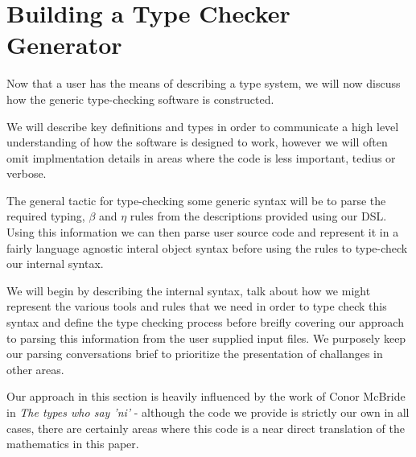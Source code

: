 \chapter{Building a Type Checker Generator}

Now that a user has the means of describing a type system, we will now
discuss how the generic type-checking software is constructed.

We will describe key definitions and types in order to communicate a
high level understanding of how the software is designed to work,
however we will often omit implmentation details in areas where the
code is less important, tedius or verbose.

The general tactic for type-checking some generic syntax will be to
parse the required typing, $\beta$ and $\eta$ rules from the
descriptions provided using our DSL. Using this information we can
then parse user source code and represent it in a fairly language
agnostic interal object syntax before using the rules to type-check
our internal syntax.

We will begin by describing the internal syntax, talk about how we
might represent the various tools and rules that we need in order to
type check this syntax and define the type checking process before
breifly covering our approach to parsing this information from the
user supplied input files. We purposely keep our parsing conversations
brief to prioritize the presentation of challanges in other areas.

Our approach in this section is heavily influenced by the work of
Conor McBride in \emph{The types who say 'ni'} \cite{TypesWhoSayNi} -
although the code we provide is strictly our own in all cases, there
are certainly areas where this code is a near direct translation of
the mathematics in this paper.

\\\\
















